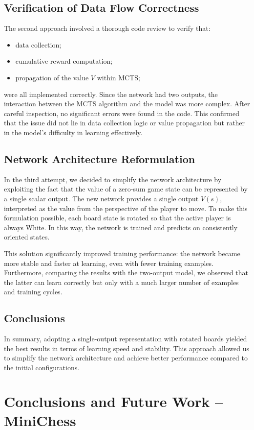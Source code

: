 \documentclass{report}
\begin{document}
\section{Verification of Data Flow Correctness}
The second approach involved a thorough code review to verify that:
\begin{itemize}
    \item data collection;
    \item cumulative reward computation;
    \item propagation of the value $V$ within MCTS;
\end{itemize}
were all implemented correctly. Since the network had two outputs, the interaction between the MCTS algorithm and the model was more complex. After careful inspection, no significant errors were found in the code. This confirmed that the issue did not lie in data collection logic or value propagation but rather in the model’s difficulty in learning effectively.

\section{Network Architecture Reformulation}
In the third attempt, we decided to simplify the network architecture by exploiting the fact that the value of a zero-sum game state can be represented by a single scalar output. The new network provides a single output $V(s)$, interpreted as the value from the perspective of the player to move. To make this formulation possible, each board state is rotated so that the active player is always White. In this way, the network is trained and predicts on consistently oriented states.

This solution significantly improved training performance: the network became more stable and faster at learning, even with fewer training examples. Furthermore, comparing the results with the two-output model, we observed that the latter can learn correctly but only with a much larger number of examples and training cycles.

\section{Conclusions}
In summary, adopting a single-output representation with rotated boards yielded the best results in terms of learning speed and stability. This approach allowed us to simplify the network architecture and achieve better performance compared to the initial configurations.
\chapter{Conclusions and Future Work – MiniChess}
 
\end{document}
